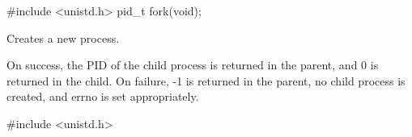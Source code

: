 #include <unistd.h>
pid_t fork(void);

Creates a new process.

On success, the PID of the child process is returned in the parent, and 0 is returned in the child.
On failure, -1 is returned in the parent, no child process is created, and errno is set appropriately.

#include <unistd.h>